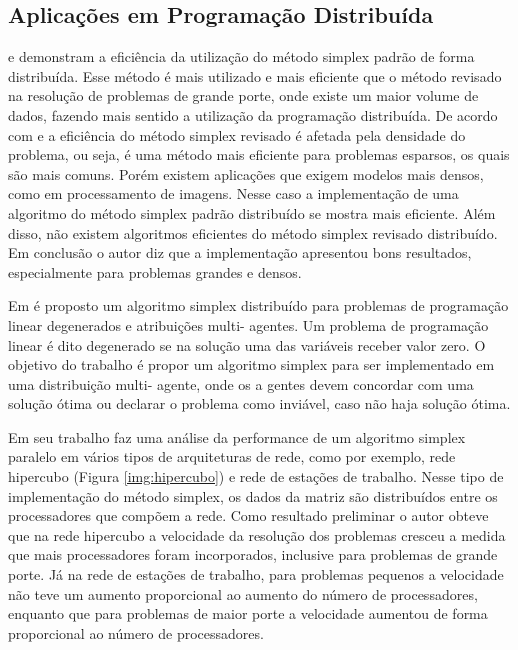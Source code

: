\subsection{Aplicações em Programação Distribuída}
 e  demonstram a eficiência da utilização do método simplex padrão de forma distribuída. Esse método é mais utilizado e mais eficiente que o método revisado na resolução de problemas de grande porte, onde existe um maior volume de dados, fazendo mais sentido a utilização da programação distribuída.
De acordo com  e  a eficiência do método simplex revisado é afetada pela densidade do problema, ou seja, é uma método mais eficiente para problemas esparsos, os quais são mais comuns. Porém existem aplicações que exigem modelos mais densos, como em processamento de imagens. Nesse caso a implementação de uma algoritmo do método simplex padrão distribuído se mostra mais eficiente. Além disso, não existem algoritmos eficientes do método simplex revisado distribuído. Em conclusão o autor diz que a implementação apresentou bons resultados, especialmente para problemas grandes e densos.

Em  é proposto um algoritmo simplex distribuído para problemas de programação linear degenerados e atribuições multi- agentes. Um problema de programação linear é dito degenerado se na solução uma das variáveis receber valor zero. O objetivo do trabalho é propor um algoritmo simplex para ser implementado em uma distribuição multi- agente, onde os a gentes devem concordar com uma solução ótima ou declarar o problema como inviável, caso não haja solução ótima.

Em seu trabalho  faz uma análise da performance de um algoritmo simplex paralelo em vários tipos de arquiteturas de rede, como por exemplo, rede hipercubo (Figura \ref{img:hipercubo}) e rede de estações de trabalho. Nesse tipo de implementação do método simplex, os dados da matriz são distribuídos entre os processadores que compõem a rede. Como resultado preliminar o autor obteve que na rede hipercubo a velocidade da resolução dos problemas cresceu a medida que mais processadores foram incorporados, inclusive para problemas de grande porte. Já na rede de estações de trabalho, para problemas pequenos a velocidade não teve um aumento proporcional ao aumento do número de processadores, enquanto que para problemas de maior porte a velocidade aumentou de forma proporcional ao número de processadores.

